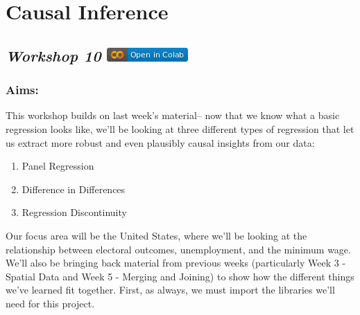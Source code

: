 \documentclass[
  letterpaper,
  DIV=11,
  numbers=noendperiod]{scrreprt}
\providecommand{\tightlist}{%
  \setlength{\itemsep}{0pt}\setlength{\parskip}{0pt}}\usepackage{longtable,booktabs,array}
\begin{document}

\hypertarget{causal-inference}{%
\chapter{Causal Inference}\label{causal-inference}}

\hypertarget{workshop-10-open-in-colab}{%
\section[\emph{Workshop 10} ]{\texorpdfstring{\emph{Workshop 10}
\href{https://colab.research.google.com/github/oballinger/QM2/blob/main/notebooks/W10.\%20Causal\%20Inference.ipynb}{\protect\includegraphics{index_files/mediabag/colab-badge.png}}}{Workshop 10 Open In Colab}}\label{workshop-10-open-in-colab}}

\hypertarget{aims-5}{%
\subsection{Aims:}\label{aims-5}}

This workshop builds on last week's material-- now that we know what a
basic regression looks like, we'll be looking at three different types
of regression that let us extract more robust and even plausibly causal
insights from our data:

\begin{enumerate}
\def\labelenumi{\arabic{enumi}.}
\tightlist
\item
  Panel Regression
\item
  Difference in Differences
\item
  Regression Discontinuity
\end{enumerate}

Our focus area will be the United States, where we'll be looking at the
relationship between electoral outcomes, unemployment, and the minimum
wage. We'll also be bringing back material from previous weeks
(particularly Week 3 - Spatial Data and Week 5 - Merging and Joining) to
show how the different things we've learned fit together. First, as
always, we must import the libraries we'll need for this project.
\end{document}
